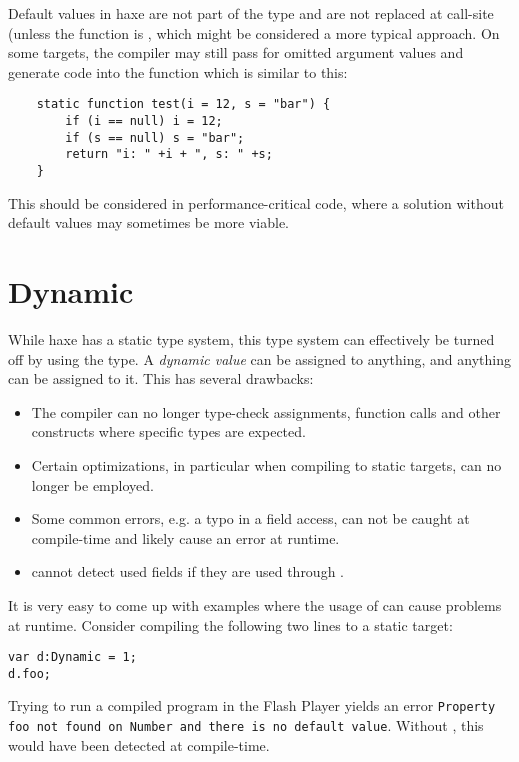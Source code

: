 \documentclass{haxe}
\begin{document}
Default values in haxe are not part of the type and are not replaced at call-site (unless the function is , which might be considered a more typical approach. On some targets, the compiler may still pass  for omitted argument values and generate code into the function which is similar to this:
\begin{lstlisting}
	static function test(i = 12, s = "bar") {
		if (i == null) i = 12;
		if (s == null) s = "bar";
		return "i: " +i + ", s: " +s;
	}
\end{lstlisting}
This should be considered in performance-critical code, where a solution without default values may sometimes be more viable.




\section{Dynamic}
\label{types-dynamic}

While haxe has a static type system, this type system can effectively be turned off by using the  type. A \emph{dynamic value} can be assigned to anything, and anything can be assigned to it. This has several drawbacks:

\begin{itemize}
	\item The compiler can no longer type-check assignments, function calls and other constructs where specific types are expected.
	\item Certain optimizations, in particular when compiling to static targets, can no longer be employed.
	\item Some common errors, e.g. a typo in a field access, can not be caught at compile-time and likely cause an error at runtime.
	\item {} cannot detect used fields if they are used through .
\end{itemize}
It is very easy to come up with examples where the usage of  can cause problems at runtime. Consider compiling the following two lines to a static target:

\begin{lstlisting}
var d:Dynamic = 1;
d.foo;
\end{lstlisting}
Trying to run a compiled program in the Flash Player yields an error \texttt{Property foo not found on Number and there is no default value}. Without , this would have been detected at compile-time.
\end{document}
